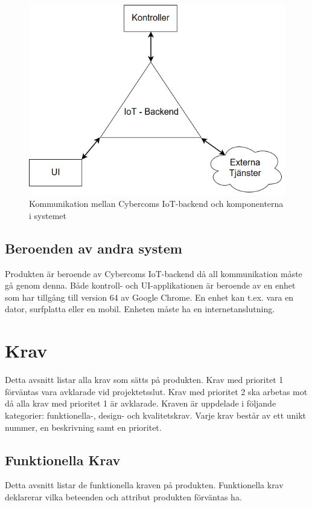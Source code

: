 \documentclass[10pt]{article}
\begin{document}
	\begin{figure}[h]
		\centering
		\includegraphics[scale=0.4]{backend}
		\caption{Kommunikation mellan Cybercoms IoT-backend och komponenterna i systemet}
		\label{fig:backend}
	\end{figure}
	
	
	\subsection{Beroenden av andra system}
	Produkten är beroende av Cybercoms IoT-backend då all kommunikation måste gå genom denna. Både kontroll- och UI-applikationen är beroende av en enhet som har tillgång till version 64 av Google Chrome. En enhet kan t.ex. vara en dator, surfplatta eller en mobil. Enheten måste ha en internetanslutning.

\pagebreak
\section{Krav}
	Detta avsnitt listar alla krav som sätts på produkten. Krav med prioritet 1 förväntas vara avklarade vid projektetsslut. Krav med prioritet 2 ska arbetas mot då alla krav med prioritet 1 är avklarade. Kraven är uppdelade i följande kategorier: funktionella-, design- och kvalitetskrav. Varje krav består av ett unikt nummer, en beskrivning samt en prioritet.
	
	\subsection{Funktionella Krav}
	Detta avsnitt listar de funktionella kraven på produkten. Funktionella krav deklarerar vilka beteenden och attribut produkten förväntas ha. 
\end{document}
